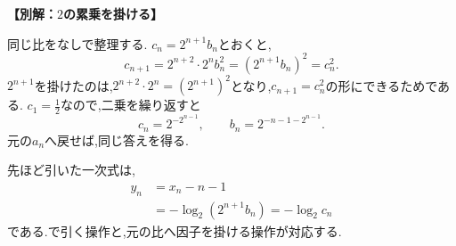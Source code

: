 \begin{enumerate}[label=\textbf{問\arabic*.},leftmargin=3.8em,format=\bookitemlink{practice-advanced}{solution}{problem}]
    \par\smallskip\noindent\textbf{【別解：$2$の累乗を掛ける】}\par\nopagebreak[4]
    同じ比をなしで整理する.
    $c_n=2^{n+1}b_n$とおくと,
    \[
      c_{n+1}=2^{n+2}\cdot2^n b_n^2
        =(2^{n+1}b_n)^2=c_n^2.
    \]
    $2^{n+1}$を掛けたのは,$2^{n+2}\cdot2^n=(2^{n+1})^2$となり,$c_{n+1}=c_n^2$の形にできるためである.
    $c_1=\frac{1}{2}$なので,二乗を繰り返すと
    \[
      c_n=2^{-2^{n-1}},\qquad
      b_n=2^{-n-1-2^{n-1}}.
    \]
    元の$a_n$へ戻せば,同じ答えを得る.
    \par\smallskip
    先ほど引いた一次式は,
    \begin{align*}
      y_n&=x_n-n-1\\
      &=-\log_2(2^{n+1}b_n)=-\log_2c_n
    \end{align*}
    である.で引く操作と,元の比へ因子を掛ける操作が対応する.
\end{enumerate}
